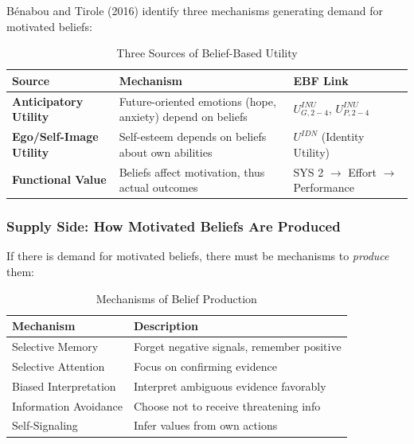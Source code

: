 Bénabou and Tirole (2016) identify three mechanisms generating demand for 
motivated beliefs:

\begin{table}[htbp]
\centering
\caption{Three Sources of Belief-Based Utility}
\label{tab:three-sources}
\renewcommand{\arraystretch}{1.4}
\begin{tabular}{@{}lp{4.2cm}p{4.8cm}@{}}
\toprule
\textbf{Source} & \textbf{Mechanism} & \textbf{EBF Link} \\
\midrule
\textbf{Anticipatory Utility} & 
Future-oriented emotions (hope, anxiety) depend on beliefs &
$U^{INU}_{G,2-4}$, $U^{INU}_{P,2-4}$ \\
\textbf{Ego/Self-Image Utility} & 
Self-esteem depends on beliefs about own abilities &
$U^{IDN}$ (Identity Utility) \\
\textbf{Functional Value} & 
Beliefs affect motivation, thus actual outcomes &
SYS 2 $\rightarrow$ Effort $\rightarrow$ Performance \\
\bottomrule
\end{tabular}
\end{table}

\subsubsection{Supply Side: How Motivated Beliefs Are Produced}
\label{subsubsec:supply-side}

If there is demand for motivated beliefs, there must be mechanisms to 
\emph{produce} them:

\begin{table}[htbp]
\centering
\caption{Mechanisms of Belief Production}
\label{tab:supply-mechanisms}
\renewcommand{\arraystretch}{1.3}
\begin{tabular}{@{}lp{5cm}@{}}
\toprule
\textbf{Mechanism} & \textbf{Description} \\
\midrule
Selective Memory & Forget negative signals, remember positive \\
Selective Attention & Focus on confirming evidence \\
Biased Interpretation & Interpret ambiguous evidence favorably \\
Information Avoidance & Choose not to receive threatening info \\
Self-Signaling & Infer values from own actions \\
\bottomrule
\end{tabular}
\end{table}

